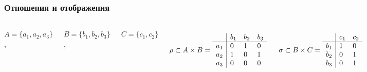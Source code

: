 \documentclass[24pt,pdf,hyperref={unicode}]{beamer}
\begin{document}
\begin{frame}\frametitle{Отношения и отображения}
\begin{columns}
$
A=\{a_1,a_2, a_3\}$, 

$B=\{b_1,b_2,b_3\}$, 

$C=\{c_1,c_2\}$

$$
\rho\subset A \times B=
\begin{array}{l|l l l}
    & b_1 & b_2 & b_3 \\
\hline
a_1 &  0  &  1 & 0 \\
a_2 &  1  &  0 & 1 \\
a_3 &  0  &  0 & 0 \\
\end{array}
$$

$$
\sigma\subset B \times C =
\begin{array}{l|l l l}
    & c_1 & c_2 \\
\hline
b_1 &  1  &  0 \\
b_2 &  0  &  1 \\
b_3 &  0  &  1 \\
\end{array}
$$



\end{columns}
\end{frame}
\end{document}
